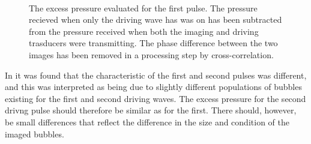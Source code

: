 \begin{figure}[t]%
  \centering
 \quad
  \subfloat[2nd pulse - 150]{
    \label{fig:exp:2nd:av:time:150:comp:control:cross:full}
    }
 \quad
  \subfloat[2nd pulse - 150]{
    \label{fig:exp:2nd:av:time:150:comp:control:cross:det}
    }\\
 \quad
  \subfloat[2nd pulse - 250]{
    \label{fig:exp:2nd:av:time:250:comp:control:cross:full}
    }
 \quad
  \subfloat[2nd pulse - 250]{
    \label{fig:exp:2nd:av:time:250:comp:control:cross:det}
    }
\caption{
    The excess pressure evaluated for the first pulse.  
    The pressure recieved when only the driving wave has was on has been subtracted from the pressure received when both the imaging and driving trasducers were transmitting.
    The phase difference between the two images has been removed in a processing step by cross-correlation.
  }
  \label{fig:exp:2nd:av:time:comp:control:cross}
\end{figure}


In \figref{} it was found that the characteristic of the first and second pulses was different,
and this was interpreted as being due to slightly different populations of bubbles existing for the first and second driving waves.
The excess pressure for the second drivng pulse should therefore be similar as for the first.
There should, however, be small differences that reflect the difference in the size and condition of the imaged bubbles.

